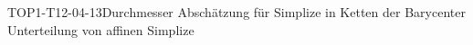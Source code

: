 
\begin{LEM}{TOP1-T12-04-13}{Durchmesser Abschätzung für Simplize in Ketten der Barycenter Unterteilung von affinen Simplize}
\end{LEM}
